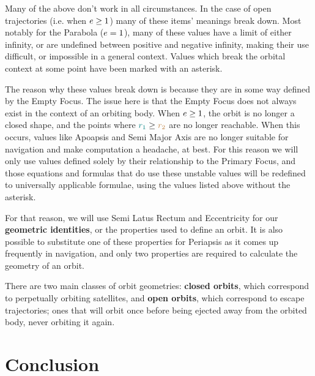 Many of the above don't work in all circumstances. In the case of open trajectories (i.e. when $\textcolor{black}{e} \geq 1$) many of these items' meanings break down. Most notably for the Parabola ($\textcolor{black}{e} = 1$), many of these values have a limit of either infinity, or are undefined between positive and negative infinity, making their use difficult, or impossible in a general context. Values which break the orbital context at some point have been marked with an asterisk.

The reason why these values break down is because they are in some way defined by the Empty Focus. The issue here is that the Empty Focus does not always exist in the context of an orbiting body. When $\textcolor{black}{e}\geq1$, the orbit is no longer a closed shape, and the points where $\textcolor{teal}{r_1} \geq \textcolor{brown}{r_2}$ are no longer reachable. When this occurs, values like Apoapsis and Semi Major Axis are no longer suitable for navigation and make computation a headache, at best. For this reason we will only use values defined solely by their relationship to the Primary Focus, and those equations and formulas that do use these unstable values will be redefined to universally applicable formulae, using the values listed above without the asterisk.

For that reason, we will use Semi Latus Rectum and Eccentricity for our \textbf{geometric identities}, or the properties used to define an orbit. It is also possible to substitute one of these properties for Periapsis as it comes up frequently in navigation, and only two properties are required to calculate the geometry of an orbit.

There are two main classes of orbit geometries: \textbf{closed orbits}, which correspond to perpetually orbiting satellites, and \textbf{open orbits}, which correspond to escape trajectories; ones that will orbit once before being ejected away from the orbited body, never orbiting it again.
\newpage

\newpage


\newpage


\newpage


\newpage


\newpage

\normalsize

\section{Conclusion}

